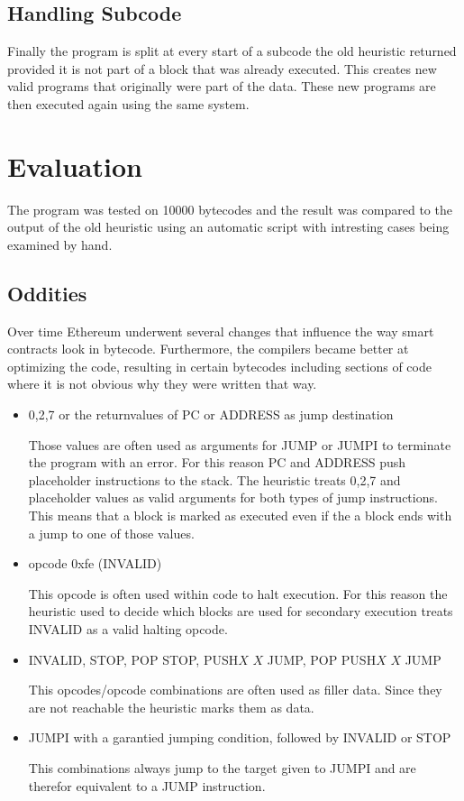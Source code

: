 \documentclass{article}
\begin{document}
\subsection{Handling Subcode}
    Finally the program is split at every start of a subcode the old heuristic returned provided it is not part of a block that was already executed. This creates new valid programs that originally were part of the data. These new programs are then executed again using the same system.
\section{Evaluation}

    The program was tested on 10000 bytecodes and the result \cite{result.csv} was compared to the output of the old heuristic using an automatic script with intresting cases being examined by hand.

\subsection{Oddities}

    Over time Ethereum underwent several changes that influence the way smart contracts look in bytecode. Furthermore, the compilers became better at optimizing the code, resulting in certain bytecodes including sections of code where it is not obvious why they were written that way.

\begin{itemize}
    \item 0,2,7 or the returnvalues of PC or ADDRESS as jump destination

    Those values are often used as arguments for JUMP or JUMPI to terminate the program with an error. For this reason PC and ADDRESS push placeholder instructions to the stack. The heuristic treats 0,2,7 and placeholder values as valid arguments for both types of jump instructions. This means that a block is marked as executed even if the a block ends with a jump to one of those values.
    
    \item opcode 0xfe (INVALID)
    
    This opcode is often used within code to halt execution. For this reason the heuristic used to decide which blocks are used for secondary execution treats INVALID as a valid halting opcode.

    \item INVALID, STOP, POP STOP, PUSH$X$ $X$ JUMP, POP PUSH$X$ $X$ JUMP 
    
    This opcodes/opcode combinations are often used as filler data. Since they are not reachable the heuristic marks them as data.

    \item JUMPI with a garantied jumping condition, followed by INVALID or STOP 
    
    This combinations always jump to the target given to JUMPI and are therefor equivalent to a JUMP instruction.
\end{itemize}
\end{document}
